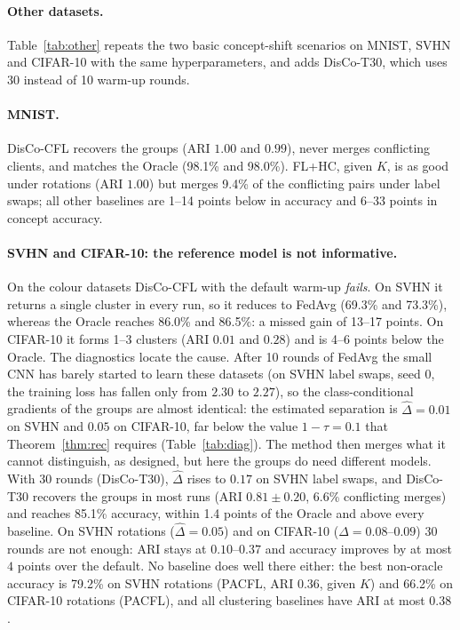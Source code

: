 \paragraph{Other datasets.}\label{sec:datasets} Table~\ref{tab:other} repeats the two basic concept-shift scenarios on MNIST, SVHN and CIFAR-10 with the same hyperparameters, and adds DisCo-T30, which uses 30 instead of 10 warm-up rounds.

\paragraph{MNIST.} DisCo-CFL recovers the groups (ARI $1.00$ and $0.99$), never merges conflicting clients, and matches the Oracle (98.1\% and 98.0\%). FL+HC, given $K$, is as good under rotations (ARI $1.00$) but merges 9.4\% of the conflicting pairs under label swaps; all other baselines are 1--14 points below in accuracy and 6--33 points in concept accuracy.

\paragraph{SVHN and CIFAR-10: the reference model is not informative.} On the colour datasets DisCo-CFL with the default warm-up \emph{fails}. On SVHN it returns a single cluster in every run, so it reduces to FedAvg (69.3\% and 73.3\%), whereas the Oracle reaches 86.0\% and 86.5\%: a missed gain of 13--17 points. On CIFAR-10 it forms 1--3 clusters (ARI $0.01$ and $0.28$) and is 4--6 points below the Oracle. The diagnostics locate the cause. After 10 rounds of FedAvg the small CNN has barely started to learn these datasets (on SVHN label swaps, seed 0, the training loss has fallen only from $2.30$ to $2.27$), so the class-conditional gradients of the groups are almost identical: the estimated separation is $\hat\Delta=0.01$ on SVHN and $0.05$ on CIFAR-10, far below the value $1-\tau=0.1$ that Theorem~\ref{thm:rec} requires (Table~\ref{tab:diag}). The method then merges what it cannot distinguish, as designed, but here the groups do need different models. With 30 rounds (DisCo-T30), $\hat\Delta$ rises to $0.17$ on SVHN label swaps, and DisCo-T30 recovers the groups in most runs (ARI $0.81\pm0.20$, 6.6\% conflicting merges) and reaches 85.1\% accuracy, within 1.4 points of the Oracle and above every baseline. On SVHN rotations ($\hat\Delta=0.05$) and on CIFAR-10 ($\hat\Delta=0.08$--$0.09$) 30 rounds are not enough: ARI stays at $0.10$--$0.37$ and accuracy improves by at most $4$ points over the default. No baseline does well there either: the best non-oracle accuracy is 79.2\% on SVHN rotations (PACFL, ARI $0.36$, given $K$) and 66.2\% on CIFAR-10 rotations (PACFL), and all clustering baselines have ARI at most $0.38$.

